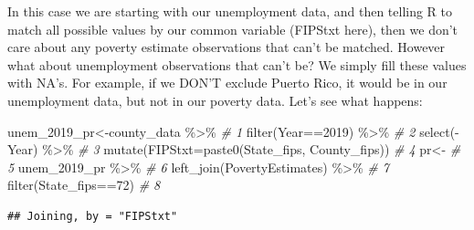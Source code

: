 \documentclass[
]{book}
\newenvironment{Shaded}{\begin{snugshade}}{\end{snugshade}}
\newcommand{\AttributeTok}[1]{\textcolor[rgb]{0.77,0.63,0.00}{#1}}
\newcommand{\CommentTok}[1]{\textcolor[rgb]{0.56,0.35,0.01}{\textit{#1}}}
\newcommand{\DecValTok}[1]{\textcolor[rgb]{0.00,0.00,0.81}{#1}}
\newcommand{\FunctionTok}[1]{\textcolor[rgb]{0.00,0.00,0.00}{#1}}
\newcommand{\NormalTok}[1]{#1}
\newcommand{\OtherTok}[1]{\textcolor[rgb]{0.56,0.35,0.01}{#1}}
\newcommand{\SpecialCharTok}[1]{\textcolor[rgb]{0.00,0.00,0.00}{#1}}
\begin{document}
In this case we are starting with our unemployment data, and then telling R to match all possible values by our common variable (FIPStxt here), then we don't care about any poverty estimate observations that can't be matched. However what about unemployment observations that can't be? We simply fill these values with NA's. For example, if we DON'T exclude Puerto Rico, it would be in our unemployment data, but not in our poverty data. Let's see what happens:

\begin{Shaded}
\begin{Highlighting}[]
\NormalTok{unem\_2019\_pr}\OtherTok{\textless{}{-}}\NormalTok{county\_data }\SpecialCharTok{\%\textgreater{}\%}                      \CommentTok{\# 1}
  \FunctionTok{filter}\NormalTok{(Year}\SpecialCharTok{==}\DecValTok{2019}\NormalTok{) }\SpecialCharTok{\%\textgreater{}\%}                           \CommentTok{\# 2}
  \FunctionTok{select}\NormalTok{(}\SpecialCharTok{{-}}\NormalTok{Year) }\SpecialCharTok{\%\textgreater{}\%}                                \CommentTok{\# 3}
  \FunctionTok{mutate}\NormalTok{(}\AttributeTok{FIPStxt=}\FunctionTok{paste0}\NormalTok{(State\_fips, County\_fips))  }\CommentTok{\# 4}
\NormalTok{pr}\OtherTok{\textless{}{-}}                                               \CommentTok{\# 5}
\NormalTok{  unem\_2019\_pr }\SpecialCharTok{\%\textgreater{}\%}                                 \CommentTok{\# 6}
  \FunctionTok{left\_join}\NormalTok{(PovertyEstimates) }\SpecialCharTok{\%\textgreater{}\%}                  \CommentTok{\# 7}
  \FunctionTok{filter}\NormalTok{(State\_fips}\SpecialCharTok{==}\DecValTok{72}\NormalTok{)                           }\CommentTok{\# 8}
\end{Highlighting}
\end{Shaded}

\begin{verbatim}
## Joining, by = "FIPStxt"
\end{verbatim}
\end{document}
